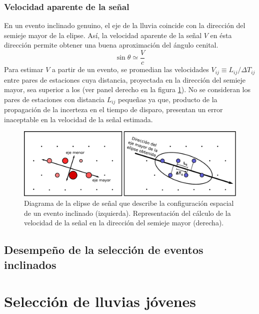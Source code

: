 		\subsubsection{Velocidad aparente de la señal}
		En un evento inclinado genuino, el eje de la lluvia coincide con la dirección del semieje mayor de la elipse.
		Así, la velocidad aparente de la señal $V$ en ésta dirección permite obtener una buena aproximación del ángulo cenital.
		\begin{equation}
		\sin\theta \simeq \frac{V}{c}
		\end{equation}
		Para estimar $V$ a partir de un evento, se promedian las velocidades $V_{ij}\equiv L_{ij}/\Delta T_{ij}$ entre pares de estaciones cuya distancia, proyectada en la dirección del semieje mayor, sea superior a los  (ver panel derecho en la figura \ref{fig:elipse}).
		No se consideran los pares de estaciones con distancia $L_{ij}$ pequeñas ya que, producto de la propagación de la incerteza en el tiempo de disparo, presentan un error inaceptable en la velocidad de la señal estimada.
		\begin{figure}[ht]
		\begin{center}
		\includegraphics[width=1.0\textwidth]{fig/seleccionAuger/elipse.pdf}
		\caption{Diagrama de la elipse de señal que describe la configuración espacial de un evento inclinado (izquierda). Representación del cálculo de la velocidad de la señal en la dirección del semieje mayor (derecha).}
		\label{fig:elipse}
		\end{center}
		\end{figure}
		
		\subsection{Desempeño de la selección de eventos inclinados}

\section{Selecci\'on de lluvias j\'ovenes}
	
